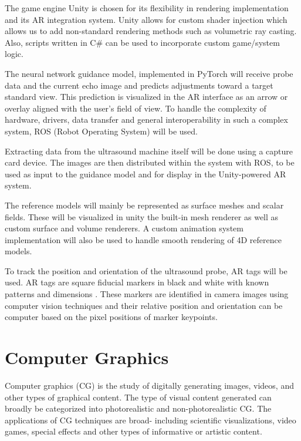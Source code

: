 \documentclass{article}
\begin{document}
The game engine Unity \cite{unity2025} is chosen for its flexibility in rendering implementation and its AR integration system.
Unity allows for custom shader injection \cite{unityShaders2025} which allows us to add non-standard rendering methods such as 
volumetric ray casting. Also, scripts written in C\# can be used to incorporate custom game/system logic.

The neural network guidance model, implemented in PyTorch \cite{paszke2019pytorch} will receive probe data and the current echo image and predicts adjustments toward a target standard view. 
This prediction is visualized in the AR interface as an arrow or overlay aligned with the user's field of view.
To handle the complexity of hardware, drivers, data transfer and general interoperability in such a complex system, 
ROS (Robot Operating System) \cite{quigley2009ros} will be used.

Extracting data from the ultrasound machine itself will be done using a capture card device.
The images are then distributed within the system with ROS, to be used as input to the guidance model
and for display in the Unity-powered AR system.

The reference models will mainly be represented as surface meshes and scalar fields. These will
be visualized in unity the built-in mesh renderer as well as custom surface and volume renderers.
A custom animation system implementation will also be used to handle smooth rendering of 4D reference models.

To track the position and orientation of the ultrasound probe, AR tags will be used.
AR tags are square fiducial markers in black and white with known patterns and dimensions \cite{nrc_artag}. These markers
are identified in camera images using computer vision techniques and their relative position and orientation
can be computer based on the pixel positions of marker keypoints.






\section{Computer Graphics}
Computer graphics (CG) is the study of digitally generating images, videos, and other types of graphical content.
The type of visual content generated can broadly be categorized into photorealistic and non-photorealistic CG.
The applications of CG techniques are broad- including scientific visualizations, video games, special effects and other types of informative or artistic content.
\end{document}
